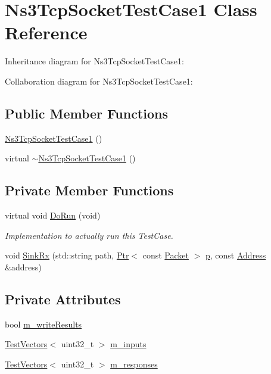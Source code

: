 \hypertarget{classNs3TcpSocketTestCase1}{}\section{Ns3\+Tcp\+Socket\+Test\+Case1 Class Reference}
\label{classNs3TcpSocketTestCase1}


Inheritance diagram for Ns3\+Tcp\+Socket\+Test\+Case1\+:


Collaboration diagram for Ns3\+Tcp\+Socket\+Test\+Case1\+:
\subsection*{Public Member Functions}
\begin{DoxyCompactItemize}
\item 
\hyperlink{classNs3TcpSocketTestCase1_a02bfa222fab12c01e537fb4101f5c25b}{Ns3\+Tcp\+Socket\+Test\+Case1} ()
\item 
virtual \hyperlink{classNs3TcpSocketTestCase1_ae44bc5c4c334759adfd52d9ead7b87a7}{$\sim$\+Ns3\+Tcp\+Socket\+Test\+Case1} ()
\end{DoxyCompactItemize}
\subsection*{Private Member Functions}
\begin{DoxyCompactItemize}
\item 
virtual void \hyperlink{classNs3TcpSocketTestCase1_a99214a78a94b82f5da1dd08243935415}{Do\+Run} (void)
\begin{DoxyCompactList}\small\item\em Implementation to actually run this Test\+Case. \end{DoxyCompactList}\item 
void \hyperlink{classNs3TcpSocketTestCase1_aaa8206a2017c32db9c6016d7cd03f731}{Sink\+Rx} (std\+::string path, \hyperlink{classns3_1_1Ptr}{Ptr}$<$ const \hyperlink{classns3_1_1Packet}{Packet} $>$ \hyperlink{lte__link__budget__x2__handover__measures_8m_ac9de518908a968428863f829398a4e62}{p}, const \hyperlink{classns3_1_1Address}{Address} \&address)
\end{DoxyCompactItemize}
\subsection*{Private Attributes}
\begin{DoxyCompactItemize}
\item 
bool \hyperlink{classNs3TcpSocketTestCase1_ade29afe16b2b075b73b708fff3d24f97}{m\+\_\+write\+Results}
\item 
\hyperlink{classns3_1_1TestVectors}{Test\+Vectors}$<$ uint32\+\_\+t $>$ \hyperlink{classNs3TcpSocketTestCase1_ae32f60c48f3d6ee8d8f3691dfe7850ed}{m\+\_\+inputs}
\item 
\hyperlink{classns3_1_1TestVectors}{Test\+Vectors}$<$ uint32\+\_\+t $>$ \hyperlink{classNs3TcpSocketTestCase1_ada714a9630cb2f16a31abcdf8de57fb7}{m\+\_\+responses}
\end{DoxyCompactItemize}
